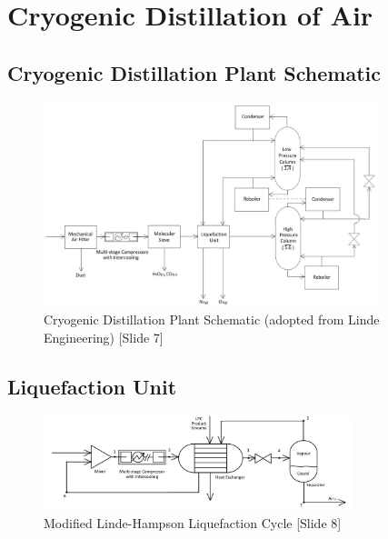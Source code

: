 

%
\section{Cryogenic Distillation of Air}

    \subsection{Cryogenic Distillation Plant Schematic}
    \begin{figure}[ht]
        \centering
        \includegraphics[width=0.87\textwidth]{airseparation/handouts/graphics/plant_diagram.jpg}
        \caption{Cryogenic Distillation Plant Schematic (adopted from Linde Engineering) [Slide 7]}
        \label{fig:plant_schematic}
    \end{figure}
    
    \subsection{Liquefaction Unit}
    \begin{figure}[ht]
        \centering
        \includegraphics[width=0.8\textwidth]{airseparation/handouts/graphics/labelled_liquefier_diagram.jpg}
        \caption{Modified Linde-Hampson Liquefaction Cycle [Slide 8]}
        \label{fig:liquefier}
    \end{figure}
    
